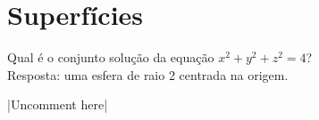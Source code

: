 \documentclass{article}
\begin{document}
\pagebreak
\section{Superfícies}
Qual é o conjunto solução da equação $x^2 + y^2 + z^2 = 4$? \\[5pt]
Resposta: uma esfera de raio 2 centrada na origem. \\[5pt]
\centerline{|Uncomment here|}
\end{document}
